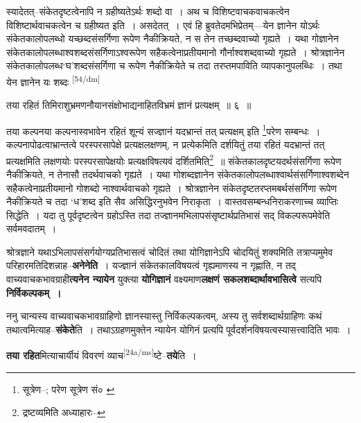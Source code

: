 \documentclass[article,12pt,a4paper]{memoir}
\begin{document}
	  \pstart स्यादेतत्--संकेतदृष्टत्वेनापि न ग्रहीष्यतेऽर्थः शब्दो वा । अथ च विशिष्टवाचकवाचकत्वेन विशिष्टार्थवाचकत्वेन च ग्रहीष्यत इति । असदेतत् । एवं हि ब्रुवतेदमभिप्रेतम्—येन ज्ञानेन योऽर्थः संकेतकालोपलब्धो यच्छब्दसंसर्गिणा रूपेण नैकीक्रियते, न स तेन तच्छब्दवाच्यो गृह्यते । यथा गोज्ञानेन संकेतकालोपलब्धाश्वशब्दसंसर्गिणाऽश्वरूपेण सहैकत्वेनाप्रतीयमानो गौर्नाश्वशब्दवाच्यो गृह्यते । श्रोत्रज्ञानेन संकेतकालोपलब्ध‘घ’शब्दसंसर्गिणा च रूपेण नैकीक्रियेते च तदा तरप्तमपाविति व्यापकानुपलब्धिः । तथा येन ज्ञानेन यः शब्दः  \leavevmode\textsuperscript{\rmlatinfont\tiny [54/dm]} 
	  
	तया रहितं तिमिराशुभ्रमणनौयानसंक्षोभाद्यनाहितविभ्रमं ज्ञानं प्रत्यक्षम् ॥ ६ ॥ 
	  
	तया कल्पनया कल्पनास्वभावेन रहितं शून्यं सज्ज्ञानं यदभ्रान्तं तत् प्रत्यक्षम् इति \footnote{सूत्रेण--\cite{dp-msD-n}; परेण सूत्रेण सं० \cite{dp-msB}}परेण सम्बन्धः । कल्पनापोढत्वाभ्रान्तत्वे परस्परसापेक्षे प्रत्यक्षलक्षणम्, न प्रत्येकमिति दर्शयितुं तया रहितं यदभ्रान्तं तत् प्रत्यक्षमिति लक्षणयोः परस्परसापेक्षयोः प्रत्यक्षविषत्यवं दर्शितमिति\footnote{द्रष्टव्यमिति अध्याहारः--\cite{dp-msD-n}} ॥ संकेतकालदृष्टयदर्थसंसर्गिणा रूपेण नैकीक्रियते, न तेनासौ तदर्थवाचको गृह्यते । यथा गोशब्दज्ञानेन संकेतकालोपलब्धाश्वार्थसंसर्गिणाश्वशब्देन सहैकत्वेनाप्रतीयमानो गोशब्दो नाश्वार्थवाचको गृह्यते । श्रोत्रज्ञानेन संकेतदृष्टतरप्तमबर्थसंसर्गिणा रूपेण नैकीक्रियते च तदा ‘ध’शब्द इति सैव असिद्धिरनुभवेन निराकृता । वास्तवसम्बन्धनिराकरणाच्च व्याप्तिः सिद्धेति । यदा तु पूर्वदृष्टत्वेन ग्रहोऽस्ति तदा तज्ज्ञानमभिलापसंसृष्टार्थप्रतिभासं सद् विकल्परूपमेवेति सर्वमवदातम् ।
	\pend
      

	  \pstart श्रोत्रज्ञाने यथाऽभिलापसंसर्गयोग्यप्रतिभासत्वं चोदितं तथा योगिज्ञानेऽपि चोदयितुं शक्यमिति तत्राप्यमुमेव परिहारमतिदिशन्नाह--\textbf{अनेनेति} । यज्ज्ञानं संकेतकालविषयत्वं गृह्यमाणस्य न गृह्णाति, न तद् वाच्यवाचकभावग्राही\textbf{त्यनेन न्यायेन} युक्त्या \textbf{योगिज्ञानं} वक्ष्यमाण\textbf{लक्षणं सकलशब्दार्थावभासित्वे} सत्यपि \textbf{निर्विकल्पकम् ।}
	\pend
      

	  \pstart ननु चान्यस्य वाच्यवाचकभावग्राहिणो ज्ञानस्यास्तु निर्विकल्पकत्वम्, अस्य तु सर्वशब्दार्थग्राहिणः कथं तथात्वमित्याह--\textbf{संकेते}ति । तथाऽग्रहणमुक्तेन न्यायेन योगिनं प्रत्यपि पूर्वदर्शनविषयत्वस्यासत्त्वादिति भावः ।
	\pend
      

	  \pstart \textbf{तया रहित}मित्याचार्यीयं विवरणं व्याच\leavevmode\textsuperscript{\rmlatinfont\tiny [24a/ms]}ष्टे--\textbf{तये}ति ।
	\pend
      
\end{document}
